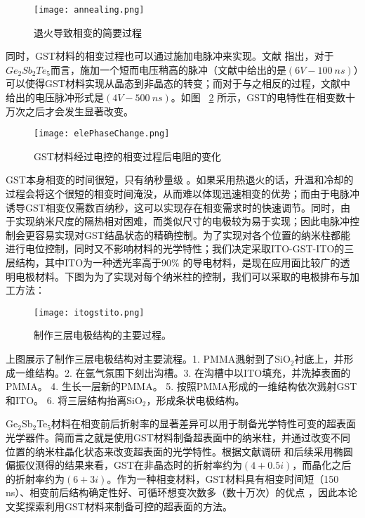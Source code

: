 \begin{figure}[H] %
  \centering
  \texttt{[image: annealing.png]}
  \caption{退火导致相变的简要过程} \cite{GSTbase2}
  \label{fig:annealing}
\end{figure}

同时，GST材料的相变过程也可以通过施加电脉冲来实现。文献 \cite{elePhaseChange} 指出，对于$Ge_{2}Sb_{2}Te_{5}$而言，施加一个短而电压稍高的脉冲（文献中给出的是$\left (6V - 100\ ns \right )$）可以使得GST材料实现从晶态到非晶态的转变；而对于与之相反的过程，文献中给出的电压脉冲形式是$\left (4V - 500\ ns \right )$。如图 ~\ref{fig:elephaseChange} 所示，GST的电特性在相变数十万次之后才会发生显著改变。
\begin{figure}[H] %
  \centering
  \texttt{[image: elePhaseChange.png]}
  \caption{GST材料经过电控的相变过程后电阻的变化} \cite{elePhaseChange2}
  \label{fig:elephaseChange}
\end{figure}

GST本身相变的时间很短，只有纳秒量级 \cite{fast}。如果采用热退火的话，升温和冷却的过程会将这个很短的相变时间淹没，从而难以体现迅速相变的优势；而由于电脉冲诱导GST相变仅需数百纳秒，这可以实现存在相变需求时的快速调节。同时，由于实现纳米尺度的隔热相对困难，而类似尺寸的电极较为易于实现；因此电脉冲控制会更容易实现对GST结晶状态的精确控制。为了实现对各个位置的纳米柱都能进行电位控制，同时又不影响材料的光学特性；我们决定采取ITO-GST-ITO的三层结构，其中ITO为一种透光率高于90\% 的导电材料，是现在应用面比较广的透明电极材料。下图为为了实现对每个纳米柱的控制，我们可以采取的电极排布与加工方法：
\begin{figure}[H] %
  \centering
  \texttt{[image: itogstito.png]}
  \caption{制作三层电极结构的主要过程。}
  \label{fig:elephaseChange1}
\end{figure}

上图展示了制作三层电极结构对主要流程。1. PMMA溅射到了SiO$_{2}$衬底上，并形成一维结构。2. 在氩气氛围下刻出沟槽。3. 在沟槽中以ITO填充，并洗掉表面的PMMA。 4. 生长一层新的PMMA。 5. 按照PMMA形成的一维结构依次溅射GST和ITO。 6. 将三层结构抬离SiO$_{2}$，形成条状电极结构。

Ge$_{2}$Sb$_{2}$Te$_{5}$材料在相变前后折射率的显著差异可以用于制备光学特性可变的超表面光学器件\cite{refocus}。简而言之就是使用GST材料制备超表面中的纳米柱，并通过改变不同位置的纳米柱晶化状态来改变超表面的光学特性。根据文献调研 \cite{GSTnk} 和后续采用椭圆偏振仪测得的结果来看，GST在非晶态时的折射率约为$\left (4 + 0.5i \right )$，而晶化之后的折射率约为$\left (6 + 3i \right )$。作为一种相变材料，GST材料具有相变时间短（150$\ $ns）、相变前后结构确定性好、可循环想变次数多（数十万次）的优点 \cite{GSTbase}，因此本论文奖探索利用GST材料来制备可控的超表面的方法。


